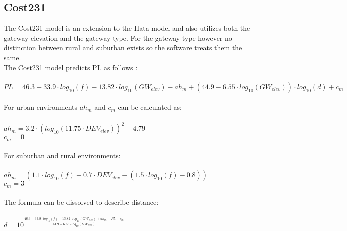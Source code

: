 \documentclass[12pt,a4paper]{article}
\begin{document}
\subsection{Cost231}
The Cost231 model is an extension to the Hata model and also utilizes both the gateway elevation and the gateway type. For the gateway type however no distinction between rural and suburban exists so the software treats them the same.\\
The Cost231 model predicts PL as follows \cite{ericsson_cost231}:\\
\\
$PL=46.3+33.9\cdot log_{10}(f)-13.82\cdot log_{10}(GW_{elev})-ah_m+(44.9-6.55\cdot log_{10}(GW_{elev}))\cdot log_{10}(d)+c_m$\\
\\
For urban environments $ah_m$ and $c_m$ can be calculated as:\\
\\
$ah_m=3.2\cdot (log_{10}(11.75\cdot DEV_{elev}))^2-4.79$\\
$c_m=0$\\
\\
For suburban and rural environments:\\
\\
$ah_m=(1.1\cdot log_{10}(f)-0.7\cdot DEV_{elev}-(1.5\cdot log_{10}(f)-0.8))$\\
$c_m=3$\\
\\
The formula can be dissolved to describe distance:\\
\\
$d=10^{\frac{46.3-33.9\cdot log_{10}(f)+13.82\cdot log_{10}(GW_{elev})+ah_m+PL-c_m}{44.9+6.55\cdot log_{10}(GW_{elev})}}$
\end{document}
